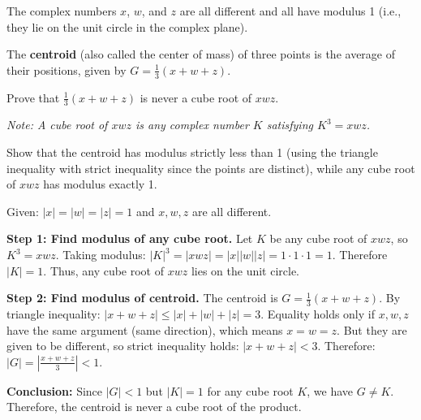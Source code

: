 \vspace{1em}

\begin{problem}
The complex numbers $x$, $w$, and $z$ are all different and all have modulus 1 (i.e., they lie on the unit circle in the complex plane).

The \textbf{centroid} (also called the center of mass) of three points is the average of their positions, given by $G = \frac{1}{3}(x + w + z)$.

Prove that $\frac{1}{3}(x + w + z)$ is never a cube root of $xwz$.

\textit{Note: A cube root of $xwz$ is any complex number $K$ satisfying $K^3 = xwz$.}
\end{problem}

\begin{hint}
Show that the centroid has modulus strictly less than 1 (using the triangle inequality with strict inequality since the points are distinct), while any cube root of $xwz$ has modulus exactly 1.
\end{hint}

\begin{solution}[Sketch]
Given: $|x| = |w| = |z| = 1$ and $x, w, z$ are all different.

\textbf{Step 1: Find modulus of any cube root.} Let $K$ be any cube root of $xwz$, so $K^3 = xwz$. Taking modulus: $|K|^3 = |xwz| = |x||w||z| = 1 \cdot 1 \cdot 1 = 1$. Therefore $|K| = 1$. Thus, any cube root of $xwz$ lies on the unit circle.

\textbf{Step 2: Find modulus of centroid.} The centroid is $G = \frac{1}{3}(x + w + z)$. By triangle inequality: $|x + w + z| \leq |x| + |w| + |z| = 3$. Equality holds only if $x, w, z$ have the same argument (same direction), which means $x = w = z$. But they are given to be different, so strict inequality holds: $|x + w + z| < 3$. Therefore: $|G| = \left|\frac{x + w + z}{3}\right| < 1$.

\textbf{Conclusion:} Since $|G| < 1$ but $|K| = 1$ for any cube root $K$, we have $G \neq K$. Therefore, the centroid is never a cube root of the product.
\end{solution}

\vspace{1em}

